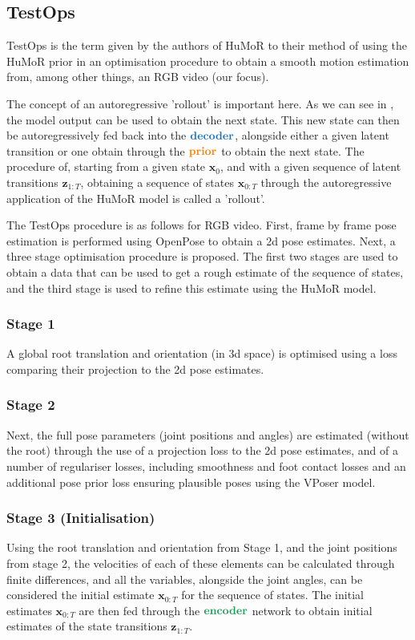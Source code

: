 \subsection{TestOps}

TestOps is the term given by the authors of HuMoR to their method of using the HuMoR prior in an optimisation procedure to obtain a smooth motion estimation from, among other things, an RGB video (our focus).

The concept of an autoregressive 'rollout' is important here. As we can see in , the model output can be used to obtain the next state. This new state can then be autoregressively fed back into the $\textbf{\textcolor{RoyalBlue}{decoder}}$, alongside either a given latent transition or one obtain through the $\textbf{\textcolor{orange}{prior}}$ to obtain the next state. The procedure of, starting from a given state $\mathbf{x}_0$, and with a given sequence of latent transitions $\textbf{z}_{1:T}$, obtaining a sequence of states $\mathbf{x}_{0:T}$ through the autoregressive application of the HuMoR model is called a 'rollout'.

The TestOps procedure is as follows for RGB video. First, frame by frame pose estimation is performed using OpenPose \cite{openPose} to obtain a 2d pose estimates. Next, a three stage optimisation procedure is proposed. The first two stages are used to obtain a data that can be used to get a rough estimate of the sequence of states, and the third stage is used to refine this estimate using the HuMoR model.

\subsubsection{Stage 1}
A global root translation and orientation (in 3d space) is optimised using a loss comparing their projection to the 2d pose estimates.

\subsubsection{Stage 2}
\label{sec:humor_stage_2}
Next, the full pose parameters (joint positions and angles) are estimated (without the root) through the use of a projection loss to the 2d pose estimates, and of a number of regulariser losses, including smoothness and foot contact losses and an additional pose prior loss ensuring plausible poses using the VPoser \cite{VPoser} model. 

\subsubsection{Stage 3 (Initialisation)}
Using the root translation and orientation from Stage 1, and the joint positions from stage 2, the velocities of each of these elements can be calculated through finite differences, and all the variables, alongside the joint angles, can be considered the initial estimate $\mathbf{x}_{0:T}$ for the sequence of states. The initial estimates $\mathbf{x}_{0:T}$ are then fed through the $\textbf{\textcolor{ForestGreen}{encoder}}$ network to obtain initial estimates of the state transitions $\textbf{z}_{1:T}$.

